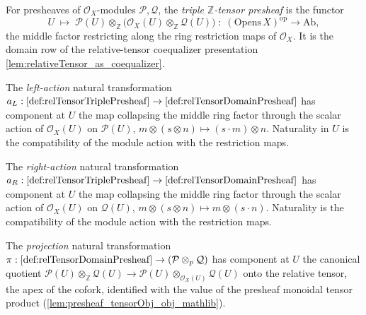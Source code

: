 \begin{definition}
  \label{def:relTensorTriplePresheaf}
  For presheaves of \(\mathcal{O}_X\)-modules \(\mathcal{P}, \mathcal{Q}\), the
  \emph{triple \(\mathbb{Z}\)-tensor presheaf} is the functor
  \[
    U \;\longmapsto\; \mathcal{P}(U) \otimes_{\mathbb{Z}}
      \bigl(\mathcal{O}_X(U) \otimes_{\mathbb{Z}} \mathcal{Q}(U)\bigr)
      \;:\; (\mathrm{Opens}\,X)^{\mathrm{op}} \to \mathrm{Ab},
  \]
  the middle factor restricting along the ring restriction maps of
  \(\mathcal{O}_X\). It is the domain row of the relative-tensor coequalizer
  presentation \cref{lem:relativeTensor_as_coequalizer}.
\end{definition}

\begin{definition}
  \label{def:relTensorActL}
  The \emph{left-action} natural transformation
  \(a_L : \cref{def:relTensorTriplePresheaf} \to \cref{def:relTensorDomainPresheaf}\)
  has component at \(U\) the map collapsing the middle ring factor through the
  scalar action of \(\mathcal{O}_X(U)\) on \(\mathcal{P}(U)\),
  \(m \otimes (s \otimes n) \mapsto (s \cdot m) \otimes n\). Naturality in \(U\)
  is the compatibility of the module action with the restriction maps.
\end{definition}

\begin{definition}
  \label{def:relTensorActR}
  The \emph{right-action} natural transformation
  \(a_R : \cref{def:relTensorTriplePresheaf} \to \cref{def:relTensorDomainPresheaf}\)
  has component at \(U\) the map collapsing the middle ring factor through the
  scalar action of \(\mathcal{O}_X(U)\) on \(\mathcal{Q}(U)\),
  \(m \otimes (s \otimes n) \mapsto m \otimes (s \cdot n)\). Naturality is the
  compatibility of the module action with the restriction maps.
\end{definition}

\begin{definition}
  \label{def:relTensorProj}
  The \emph{projection} natural transformation
  \(\pi : \cref{def:relTensorDomainPresheaf} \to (\mathcal{P} \otimes_p
  \mathcal{Q})\) has component at \(U\) the canonical quotient
  \(\mathcal{P}(U) \otimes_{\mathbb{Z}} \mathcal{Q}(U) \to \mathcal{P}(U)
  \otimes_{\mathcal{O}_X(U)} \mathcal{Q}(U)\) onto the relative tensor, the apex of
  the cofork, identified with the value of the presheaf monoidal tensor product
  (\cref{lem:presheaf_tensorObj_obj_mathlib}).
\end{definition}

